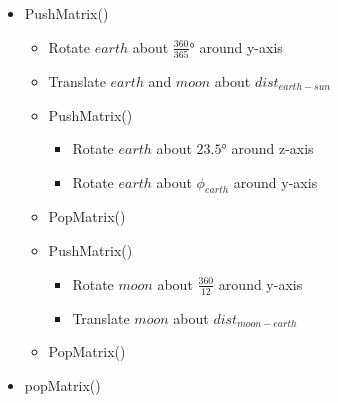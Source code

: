 \documentclass{article}
\begin{document}
\begin{itemize}
\item PushMatrix()
\begin{itemize}
\item Rotate $earth$ about $\frac{360}{365}$° around y-axis
\item Translate $earth$ and $moon$ about $dist_{earth-sun}$
\item PushMatrix()
\begin{itemize}
\item Rotate $earth$ about $23.5°$ around z-axis
\item Rotate $earth$ about $\phi_{earth}$ around y-axis
\end{itemize}
\item PopMatrix()
\item PushMatrix()
\begin{itemize}
\item Rotate $moon$ about $\frac{360}{12}$ around y-axis
\item Translate $moon$ about $dist_{moon-earth}$
\end{itemize}
\item PopMatrix()
\end{itemize}

\item popMatrix()
\end{itemize}
\end{document}
